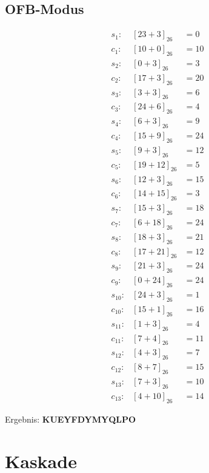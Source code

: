 \documentclass{../crypto}
\begin{document}
\subsection{OFB-Modus}
\begin{align*}
    s_{1}: & \left[23+3\right]_{26} &= 0\\
    c_{1}: & \left[10+0\right]_{26} &= 10\\
    s_{2}: & \left[0+3\right]_{26} &= 3\\
    c_{2}: & \left[17+3\right]_{26} &= 20\\
    s_{3}: & \left[3+3\right]_{26} &= 6\\
    c_{3}: & \left[24+6\right]_{26} &= 4\\
    s_{4}: & \left[6+3\right]_{26} &= 9\\
    c_{4}: & \left[15+9\right]_{26} &= 24\\
    s_{5}: & \left[9+3\right]_{26} &= 12\\
    c_{5}: & \left[19+12\right]_{26} &= 5\\
    s_{6}: & \left[12+3\right]_{26} &= 15\\
    c_{6}: & \left[14+15\right]_{26} &= 3\\
    s_{7}: & \left[15+3\right]_{26} &= 18\\
    c_{7}: & \left[6+18\right]_{26} &= 24\\
    s_{8}: & \left[18+3\right]_{26} &= 21\\
    c_{8}: & \left[17+21\right]_{26} &= 12\\
    s_{9}: & \left[21+3\right]_{26} &= 24\\
    c_{9}: & \left[0+24\right]_{26} &= 24\\
    s_{10}: & \left[24+3\right]_{26} &= 1\\
    c_{10}: & \left[15+1\right]_{26} &= 16\\
    s_{11}: & \left[1+3\right]_{26} &= 4\\
    c_{11}: & \left[7+4\right]_{26} &= 11\\
    s_{12}: & \left[4+3\right]_{26} &= 7\\
    c_{12}: & \left[8+7\right]_{26} &= 15\\
    s_{13}: & \left[7+3\right]_{26} &= 10\\
    c_{13}: & \left[4+10\right]_{26} &= 14
\end{align*}

Ergebnis: \textbf{KUEYFDYMYQLPO}

\section{Kaskade}
\end{document}
